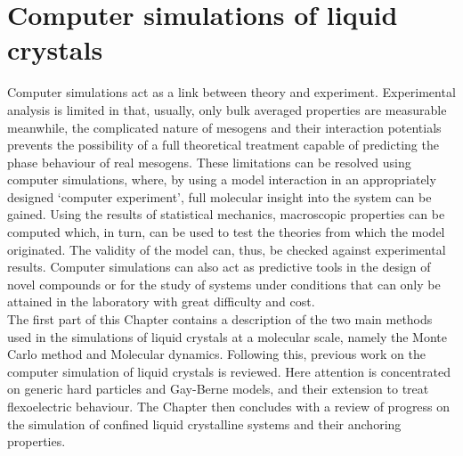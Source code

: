 
\chapter{Computer simulations of liquid crystals}
\label{chap:two}

\introduction

Computer simulations act as a link between theory and experiment. Experimental analysis is
limited in that, usually,  only bulk averaged properties are measurable meanwhile, the complicated
nature of mesogens and their interaction potentials prevents the possibility of a full theoretical 
treatment capable of  predicting the phase behaviour of real mesogens. These
limitations can be resolved using computer simulations, where, by using a model interaction
in an appropriately designed `computer experiment', full molecular insight into the system can be
gained. Using the results of statistical mechanics, macroscopic properties can be computed 
which, in turn, can be used to test the theories from which the model originated.
The validity of the model can, thus, be checked against experimental results. Computer simulations can
also act as predictive tools in the design of novel compounds or for the study of systems under
conditions that can only be attained in the laboratory with great difficulty and cost.\\
The first part of this Chapter contains a description of the two main methods used in the simulations 
of liquid crystals at a
molecular scale, namely the Monte Carlo method and Molecular dynamics. Following this, previous
work on the computer simulation of liquid crystals is reviewed. Here attention is concentrated on
generic hard particles and Gay-Berne models, and their extension to treat flexoelectric
behaviour.
The Chapter then concludes with a review of progress on the simulation of confined liquid 
crystalline systems and their anchoring properties.







